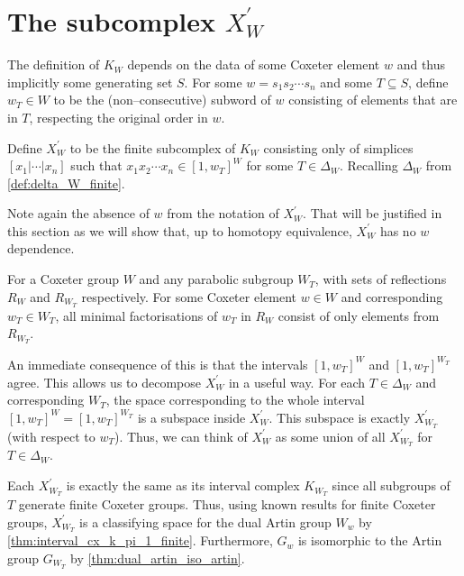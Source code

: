 \documentclass[class=article, crop=false]{standalone}
\begin{document}
\section{The subcomplex \texorpdfstring{$X_{W}^\prime$}{X W Prime}}
The definition of $K_{W}$ depends on the data of some Coxeter element $w$ and thus implicitly some generating set $S$. For some $w = s_1s_2\cdots s_n$ and some $T\subseteq S$, define $w_T\in W$ to be the (non--consecutive) subword of $w$ consisting of elements that are in $T$, respecting the original order in $w$. 
\begin{definition}
    Define $X_{W}^\prime$ to be the finite subcomplex of $K_{W}$ consisting only of simplices $[x_1 | \cdots | x_n]$ such that $x_1x_2\cdots x_n \in [1,w_T]^W$ for some $T \in \Delta_W$. Recalling $\Delta_W$ from \cref{def:delta_W_finite}.
    \label{def:subcomplex_X_prime}
\end{definition}
Note again the absence of $w$ from the notation of $X^\prime_W$. That will be justified in this section as we will show that, up to homotopy equivalence, $X_W^\prime$ has no $w$ dependence.

\begin{lemma}[{\cite[Lemma 5.2]{paolini_salvetti_kpi1_2021}}]
    For a Coxeter group $W$ and any parabolic subgroup $W_T$, with sets of reflections $R_W$ and $R_{W_T}$ respectively. For some Coxeter element $w \in W$ and corresponding $w_T \in W_T$, all minimal factorisations of $w_T$ in $R_W$ consist of only elements from $R_{W_T}$.
    \label{lem:all_decompositions_of_w_T_are_R}
\end{lemma}
An immediate consequence of this is that the intervals $[1,w_T]^W$ and $[1,w_T]^{W_T}$ agree. This allows us to decompose $X^\prime_W$ in a useful way. For each $T \in \Delta_W$ and corresponding $W_T$, the space corresponding to the whole interval $[1, w_T]^W=[1,w_T]^{W_T}$ is a subspace inside $X^\prime_W$. This subspace is exactly $X^\prime_{W_T}$ (with respect to $w_T$). Thus, we can think of $X^\prime_W$ as some union of all $X^\prime_{W_T}$ for $T \in \Delta_W$.

Each $X^\prime_{W_T}$ is exactly the same as its interval complex $K_{{W_T}}$ since all subgroups of $T$ generate finite Coxeter groups. Thus, using known results for finite Coxeter groups, $X^\prime_{W_T}$ is a classifying space for the dual Artin group $W_w$ by \cref{thm:interval_cx_k_pi_1_finite}. Furthermore, $G_w$ is isomorphic to the Artin group $G_{W_T}$ by \cref{thm:dual_artin_iso_artin}.
\end{document}
